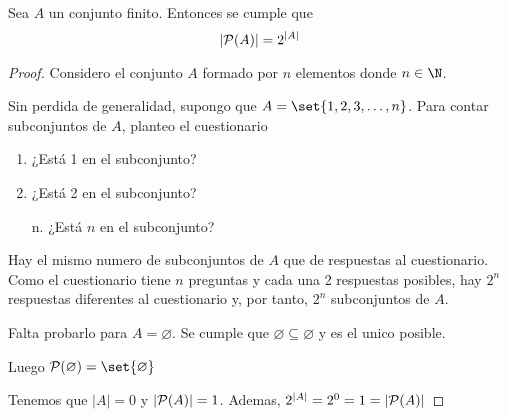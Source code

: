 \begin{theorem}
	Sea \(A \) un conjunto finito. Entonces se cumple que
	\[
		|\mathcal{\MakeUppercase{p}}(A)| = 2^{|A|}
	\]
\end{theorem}
\begin{proof}
	Considero el conjunto \(A \) formado por \(n \) elementos donde \(n \in \N\).

	Sin perdida de generalidad, supongo que \(A = \set{1,2,3,\ldots,n}\). Para contar subconjuntos de \(A \), planteo el cuestionario \begin{enumerate}
		\item ¿Está 1 en el subconjunto?
		\item ¿Está 2 en el subconjunto?
		\item[n.] ¿Está \(n \) en el subconjunto?
	\end{enumerate}
	Hay el mismo numero de subconjuntos de \(A \) que de respuestas al cuestionario. Como el cuestionario tiene \(n \) preguntas y cada una 2 respuestas posibles, hay \(2^{n } \) respuestas diferentes al cuestionario y, por tanto, \(2^{n } \) subconjuntos de \(A \).

	Falta probarlo para \(A = \varnothing\). Se cumple que \(\varnothing \subseteq \varnothing\) y es el unico posible.

	Luego \(\mathcal{\MakeUppercase{p}}(\varnothing) = \set{\varnothing}\)

	Tenemos que \(|A| = 0 \) y \(|\mathcal{\MakeUppercase{p}}(A)| = 1\). Ademas, \(2^{|A|} = 2^{0} = 1 = |\mathcal{\MakeUppercase{p}}(A)|  \)
\end{proof}
